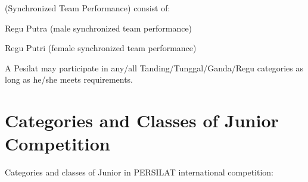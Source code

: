 \begin{legal}
\begin{legal}
    \item {} (Synchronized Team Performance) consist of:
        \begin{legal}
        \item Regu Putra (male synchronized team performance)
        \item Regu Putri (female synchronized team performance)
        \end{legal}
    \end{legal}


    A Pesilat may participate in any/all Tanding/Tunggal/Ganda/Regu categories as long as he/she 
    meets requirements.

\end{legal}


\section{Categories and Classes of Junior Competition}
\label{sec:junior}

Categories and classes of Junior in PERSILAT international competition:

